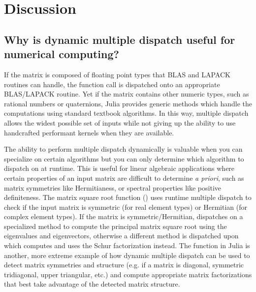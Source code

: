 \section{Discussion}

\subsection{Why is dynamic multiple dispatch useful for numerical computing?}

If the matrix is composed of floating point types that BLAS and
LAPACK routines can handle, the function call is dispatched onto an
appropriate BLAS/LAPACK routine. Yet if the matrix contains other
numeric types, such as rational numbers or quaternions, Julia provides
generic methods which handle the computations using standard textbook
algorithms. In this way, multiple dispatch allows the widest possible
set of inputs while not giving up the ability to use handcrafted
performant kernels when they are available.

The ability to perform multiple dispatch dynamically is valuable
when you can specialize on certain algorithms but you can only
determine which algorithm to dispatch on at runtime. This is useful
for linear algebraic applications where certain properties of an input
matrix are difficult to determine \textit{a priori}, such as matrix
symmetries like Hermitianess, or spectral properties like positive
definiteness. The matrix square root function () uses
runtime multiple dispatch to check if the input matrix is symmetric
(for real element types) or Hermitian (for complex element types). If
the matrix is symmetric/Hermitian,  dispatches on a
specialized method to compute the principal matrix square root using
the eigenvalues and eigenvectors, otherwise a different method is
dispatched upon which computes and uses the Schur factorization
instead. The  function in Julia is another, more
extreme example of how dynamic multiple dispatch can be used to detect
matrix symmetries and structure (e.g. if a matrix is diagonal,
symmetric tridiagonal, upper triangular, etc.) and compute appropriate
matrix factorizations that best take advantage of the detected matrix
structure.

